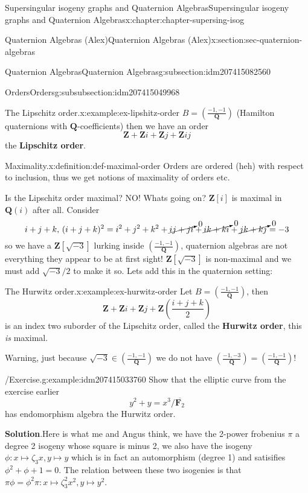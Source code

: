 \documentclass[oneside,10pt,]{book}
\newcommand{\terminology}[1]{\textbf{#1}}
\numberwithin{equation}{section}
\newcommand{\legendre}[2]{\left(\frac{#1}{#2}\right)}
\newcommand{\lb}{[}
\newcommand{\rb}{]}
\newcommand{\ZZ}{\mathbf{Z}}
\newcommand{\QQ}{\mathbf{Q}}
\newcommand{\FF}{\mathbf{F}}
\begin{document}
\begin{chapterptx}{Supersingular isogeny graphs and Quaternion Algebras}{}{Supersingular isogeny graphs and Quaternion Algebras}{}{}{x:chapter:chapter-supersing-isog}
\begin{sectionptx}{Quaternion Algebras (Alex)}{}{Quaternion Algebras (Alex)}{}{}{x:section:sec-quaternion-algebras}
\begin{subsectionptx}{Quaternion Algebras}{}{Quaternion Algebras}{}{}{g:subsection:idm207415082560}
\begin{subsubsectionptx}{Orders}{}{Orders}{}{}{g:subsubsection:idm207415049968}
\begin{example}{The Lipschitz order.}{x:example:ex-lipshitz-order}
\(B = \legendre{-1,-1}{\QQ}\) (Hamilton quaternions with \(\QQ\)-coefficients) then we have an order%
\begin{equation*}
\ZZ + \ZZ i + \ZZ j + \ZZ ij
\end{equation*}
the \terminology{Lipschitz order}.%
\end{example}
\begin{definition}{Maximality.}{x:definition:def-maximal-order}%
Orders are ordered (heh) with respect to inclusion, thus we get notions of maximality of orders etc.%
\end{definition}
Is the Lipschitz order maximal? NO! Whats going on? \(\ZZ\lb i\rb\) is maximal in \(\QQ(i)\) after all. Consider%
\begin{equation*}
i + j + k,\,(i+j + k)^2 = i^2 + j^2 + k^2 + \cancelto{0}{ij + ji} + \cancelto{0}{ik + ki} + \cancelto{0}{jk + kj} = -3
\end{equation*}
so we have a \(\ZZ\lb \sqrt{-3}\rb\) lurking inside \(\legendre{-1,-1}{\QQ}\), quaternion algebras are not everything they appear to be at first sight! \(\ZZ\lb \sqrt{-3}\rb\) is non-maximal and we must add \(\sqrt{-3}/2\) to make it so. Lets add this in the quaternion setting:%
\begin{example}{The Hurwitz order.}{x:example:ex-hurwitz-order}%
Let \(B = \legendre{-1,-1}{\QQ}\), then%
\begin{equation*}
\ZZ+  \ZZ i + \ZZ j + \ZZ \left(\frac{i + j + k}{2}\right)
\end{equation*}
is an index two suborder of the Lipschitz order, called the \terminology{Hurwitz order}, this \emph{is} maximal.%
\end{example}
Warning, just because \(\sqrt{-3} \in \legendre{-1,-1}{\QQ}\) we do not have \(\legendre{-1,-3}{\QQ} = \legendre{-1,-1}{\QQ}\)!%
\begin{example}{\slash{}Exercise.}{g:example:idm207415033760}%
Show that the elliptic curve from the exercise earlier%
\begin{equation*}
y^2 + y = x^3/\overline{\FF_2}
\end{equation*}
has endomorphism algebra the Hurwitz order.%
\par\smallskip%
\noindent\textbf{Solution}.\hypertarget{g:solution:idm207415032448}{}\quad{}Here is what me and Angus think, we have the 2-power frobenius \(\pi\) a degree 2 isogeny whose square is minus 2, we also have the isogeny \(\phi \colon x\mapsto \zeta_3 x, y\mapsto y\) which is in fact an automorphism (degree 1) and satisifies \(\phi^2 + \phi + 1 = 0\). The relation between these two isogenies is that \(\pi \phi  = \phi^2 \pi \colon x\mapsto \zeta_3^2 x^2, y\mapsto y^2\).%

\end{example}
\end{subsubsectionptx}
\end{subsectionptx}
\end{sectionptx}
\end{chapterptx}
\end{document}
